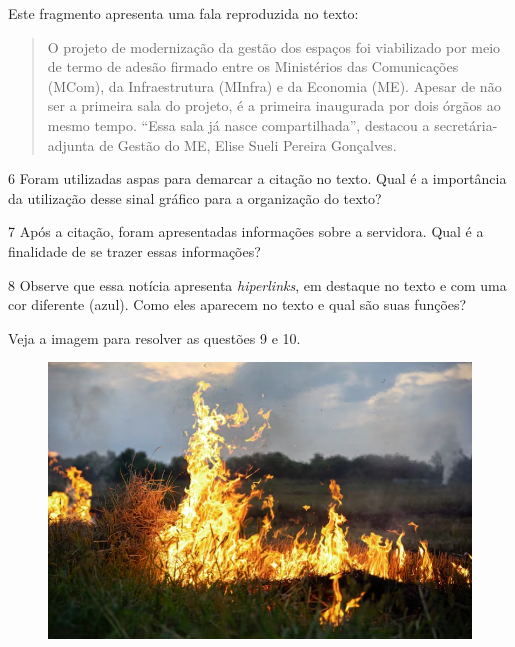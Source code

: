 Este fragmento apresenta uma fala reproduzida no texto:

\begin{quote}
O projeto de modernização da gestão dos espaços foi viabilizado por
meio de termo de adesão firmado entre os Ministérios das Comunicações
(MCom), da Infraestrutura (MInfra) e da Economia (ME). Apesar de não ser
a primeira sala do projeto, é a primeira inaugurada por dois órgãos ao
mesmo tempo. ``Essa sala já nasce compartilhada'', destacou a
secretária-adjunta de Gestão do ME, Elise Sueli Pereira Gonçalves.
\end{quote}

\num{6} Foram utilizadas aspas para demarcar a citação no texto. Qual é a
importância da utilização desse sinal gráfico para a organização do
texto?


\num{7} Após a citação, foram apresentadas informações sobre a servidora.
Qual é a finalidade de se trazer essas informações?


\num{8} Observe que essa notícia apresenta \emph{hiperlinks}, em destaque no
texto e com uma cor diferente (azul). Como eles aparecem no texto e qual
são suas funções?


Veja a imagem para resolver as questões 9 e 10.

\begin{figure}[htpb!]
\centering
\includegraphics[width=.9\textwidth]{./media/img1pt.png}
\end{figure}


